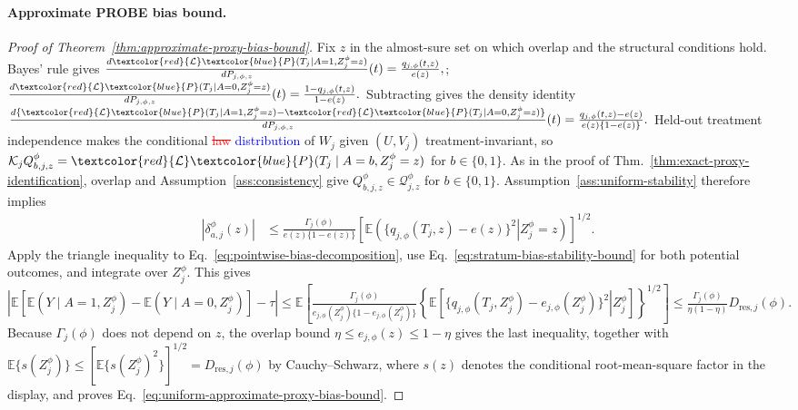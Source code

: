\paragraph{Approximate PROBE bias bound.}
\begin{proof}[Proof of Theorem~\ref{thm:approximate-proxy-bias-bound}]
Fix $z$ in the almost-sure set on which overlap and the structural conditions hold. Bayes' rule gives
\(\frac{d \textcolor{red}{\mathcal L}\textcolor{blue}{P}(T_j\mid A=1,Z_j^\phi=z)}{dP_{j,\phi,z}}(t) =\frac{q_{j,\phi}(t,z)}{e(z)},\); \(\frac{d \textcolor{red}{\mathcal L}\textcolor{blue}{P}(T_j\mid A=0,Z_j^\phi=z)}{dP_{j,\phi,z}}(t) =\frac{1-q_{j,\phi}(t,z)}{1-e(z)}.\)
Subtracting gives the density identity
\(\frac{d\{ \textcolor{red}{\mathcal L}\textcolor{blue}{P}(T_j\mid A=1,Z_j^\phi=z) - \textcolor{red}{\mathcal L}\textcolor{blue}{P}(T_j\mid A=0,Z_j^\phi=z)\}} {dP_{j,\phi,z}}(t) = \frac{q_{j,\phi}(t,z)-e(z)} {e(z)\{1-e(z)\}}.\)
Held-out treatment independence makes the conditional \textcolor{red}{\sout{law}} \textcolor{blue}{distribution} of $W_j$ given $(U,V_j)$ treatment-invariant, so $\mathcal K_jQ_{b,j,z}^{\phi}= \textcolor{red}{\mathcal L}\textcolor{blue}{P}(T_j\mid A=b,Z_j^\phi=z)$ for $b\in\{0,1\}$. As in the proof of Thm.~\ref{thm:exact-proxy-identification}, overlap and Assumption~\ref{ass:consistency} give $Q^{\phi}_{b,j,z}\in\mathcal Q^{\phi}_{j,z}$ for $b\in\{0,1\}$. Assumption~\ref{ass:uniform-stability} therefore implies
\begin{align}
|\delta_{a,j}^{\phi}(z)|
&\le
\frac{\Gamma_j(\phi)}{e(z)\{1-e(z)\}}
\left[
\mathbb E\!\left(
\left.
\{q_{j,\phi}(T_j,z)-e(z)\}^2
\right|Z_j^\phi=z
\right)
\right]^{1/2}.
\label{eq:stratum-bias-stability-bound}
\end{align}
Apply the triangle inequality to Eq.~\eqref{eq:pointwise-bias-decomposition}, use Eq.~\eqref{eq:stratum-bias-stability-bound} for both potential outcomes, and integrate over $Z_j^\phi$. This gives
\(\left| \mathbb E\!\left[ \mathbb E(Y\mid A=1,Z_j^\phi) - \mathbb E(Y\mid A=0,Z_j^\phi) \right] -\tau \right| \le \mathbb E\!\left[ \frac{\Gamma_j(\phi)} {e_{j,\phi}(Z_j^\phi)\{1-e_{j,\phi}(Z_j^\phi)\}} \left\{ \mathbb E\!\left[ \left. \{q_{j,\phi}(T_j,Z_j^\phi)-e_{j,\phi}(Z_j^\phi)\}^2 \right|Z_j^\phi \right] \right\}^{1/2} \right] \le \frac{\Gamma_j(\phi)}{\eta(1-\eta)}D_{\mathrm{res},j}(\phi).\)
Because $\Gamma_j(\phi)$ does not depend on $z$, the overlap bound $\eta\le e_{j,\phi}(z)\le1-\eta$ gives the last inequality, together with $\mathbb E\{s(Z_j^\phi)\}\le[\mathbb E\{s(Z_j^\phi)^2\}]^{1/2}=D_{\mathrm{res},j}(\phi)$ by Cauchy--Schwarz, where $s(z)$ denotes the conditional root-mean-square factor in the display, and proves Eq.~\eqref{eq:uniform-approximate-proxy-bias-bound}.
\end{proof}

